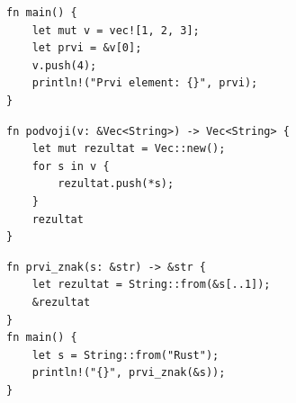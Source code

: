 \documentclass[11pt]{../izpit}
\begin{document}
\podnaloga
\begin{verbatim}
fn main() {
    let mut v = vec![1, 2, 3];
    let prvi = &v[0];
    v.push(4);
    println!("Prvi element: {}", prvi);
}
\end{verbatim}

\podnaloga
\begin{verbatim}
fn podvoji(v: &Vec<String>) -> Vec<String> {
    let mut rezultat = Vec::new();
    for s in v {
        rezultat.push(*s);
    }
    rezultat
}
\end{verbatim}

\podnaloga
\begin{verbatim}
fn prvi_znak(s: &str) -> &str {
    let rezultat = String::from(&s[..1]);
    &rezultat
}
fn main() {
    let s = String::from("Rust");
    println!("{}", prvi_znak(&s));
}
\end{verbatim}
\end{document}
